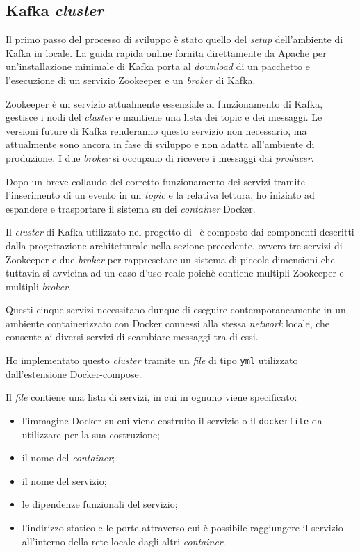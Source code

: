 \subsection{Kafka \textit{cluster}}

Il primo passo del processo di sviluppo è stato quello del \textit{setup} dell'ambiente di Kafka in locale.
La guida rapida online fornita direttamente da Apache per un'installazione minimale di Kafka porta al \textit{download} di un pacchetto e l'esecuzione di un servizio Zookeeper e un \textit{broker} di Kafka.

Zookeeper è un servizio attualmente essenziale al funzionamento di Kafka, gestisce i nodi del \textit{cluster} e mantiene una lista dei topic e dei messaggi.
Le versioni future di Kafka renderanno questo servizio non necessario, ma attualmente sono ancora in fase di sviluppo e non adatta all'ambiente di produzione.
I due \textit{broker} si occupano di ricevere i messaggi dai \textit{producer}.

Dopo un breve collaudo del corretto funzionamento dei servizi tramite l'inserimento di un evento in un \textit{topic} e la relativa lettura, ho iniziato ad espandere e trasportare il sistema su dei \textit{container} Docker.

Il \textit{cluster} di Kafka utilizzato nel progetto di \stage\ è composto dai componenti descritti dalla progettazione architetturale nella sezione precedente, ovvero tre servizi di Zookeeper e due \textit{broker} per rappresetare un sistema di piccole dimensioni che tuttavia si avvicina ad un caso d'uso reale poichè contiene multipli Zookeeper e multipli \textit{broker}.

Questi cinque servizi necessitano dunque di eseguire contemporaneamente in un ambiente containerizzato con Docker connessi alla stessa \textit{network} locale, che consente ai diversi servizi di scambiare messaggi tra di essi.

Ho implementato questo \textit{cluster} tramite un
\textit{file} di tipo \texttt{yml} utilizzato dall'estensione Docker-compose.

\noindent
Il \textit{file} contiene una lista di servizi, in cui in ognuno viene specificato:
\begin{itemize}
  \item l'immagine Docker su cui viene costruito il servizio o il \texttt{dockerfile} da utilizzare per la sua costruzione;
  \item il nome del \textit{container};
  \item il nome del servizio;
  \item le dipendenze funzionali del servizio;
  \item l'indirizzo  statico e le porte attraverso cui è possibile raggiungere il servizio all'interno della rete locale dagli altri \textit{container}.
\end{itemize}


